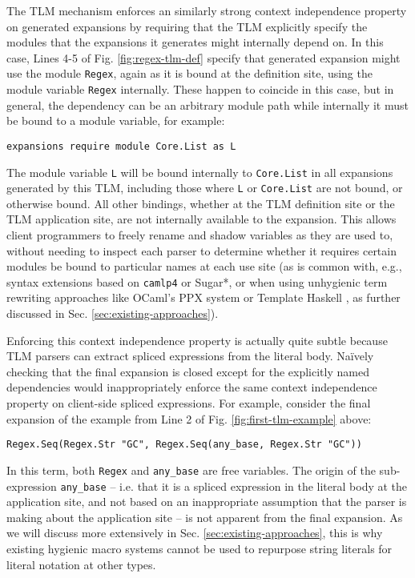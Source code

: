 \documentclass[acmsmall,review,anonymous]{acmart}\settopmatter{printfolios=true,printccs=false,printacmref=false}
\newcommand{\li}[1]{\lstinline[basicstyle=\ttfamily\fontsize{9pt}{1em}\selectfont]{#1}}
\begin{document}
The TLM mechanism enforces an similarly strong context independence property on generated expansions by requiring that the TLM explicitly specify the modules that the expansions it generates might internally depend on. In this case, Lines 4-5 of Fig. \ref{fig:regex-tlm-def} specify that generated expansion might use the module \li{Regex}, again as it is bound at the definition site, using the module variable \li{Regex} internally. These happen to coincide in this case, but in general, the dependency can be an arbitrary module path while internally it must be bound to a module variable, for example:
\begin{lstlisting}[numbers=none]
  expansions require module Core.List as L
\end{lstlisting}
The module variable \li{L} will be bound internally to \li{Core.List} in all expansions generated by this TLM, including those where \li{L} or \li{Core.List} are not bound, or otherwise bound. All other bindings, whether at the TLM definition site or the TLM application site, are not internally available to the expansion. This allows client programmers to freely rename and shadow variables as they are used to, without needing to inspect each parser to determine whether it requires certain modules be bound to particular names at each use site (as is common with, e.g., syntax extensions based on \li{camlp4} or Sugar*, or when using unhygienic term rewriting approaches like OCaml's PPX system or Template Haskell \cite{SheardPeytonJones:Haskell-02}, as further discussed in Sec. \ref{sec:existing-approaches}).

Enforcing this context independence property is actually quite subtle because TLM parsers can extract spliced expressions from the literal body. Na\"ively checking that the final expansion is closed except for the explicitly named dependencies would inappropriately enforce the same context independence property on client-side spliced expressions. For example, consider the final expansion of the example from Line 2 of Fig. \ref{fig:first-tlm-example} above:
\begin{lstlisting}[numbers=none]
  Regex.Seq(Regex.Str "GC", Regex.Seq(any_base, Regex.Str "GC"))
\end{lstlisting}
In this term, both \li{Regex} and \li{any_base} are free variables. The origin of the sub-expression \li{any_base} -- i.e. that it is a spliced expression in the literal body at the application site, and not based on an inappropriate assumption that the parser is making about the application site -- is not apparent from the final expansion. As we will discuss more extensively in Sec. \ref{sec:existing-approaches}, this is why existing hygienic macro systems cannot be used to repurpose string literals for literal notation at other types.
\end{document}
